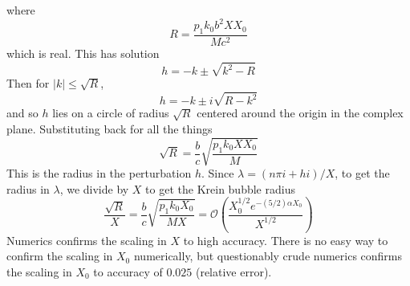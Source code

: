 \documentclass[thesis.tex]{subfiles}
\begin{document}
where 
\[
R = \frac{p_1 k_0 b^2 X X_0 }{M c^2}
\]
which is real. This has solution
\[
h = -k \pm \sqrt{k^2 - R}
\]
Then for $|k| \leq \sqrt{R}$,
\[
h = -k \pm i \sqrt{R - k^2}
\]
and so $h$ lies on a circle of radius $\sqrt{R}$ centered around the origin in the complex plane. Substituting back for all the things
\[
\sqrt{R} = \frac{b}{c} \sqrt{\frac{p_1 k_0 X X_0 }{M} }
\]
This is the radius in the perturbation $h$. Since $\lambda = (n \pi i + h i)/X$, to get the radius in $\lambda$, we divide by $X$ to get the Krein bubble radius
\[
\frac{\sqrt{R}}{X} = \frac{b}{c} \sqrt{\frac{p_1 k_0 X_0 }{M X} } = \mathcal{O}\left(\frac{ X_0^{1/2} e^{-(5/2) \alpha X_0} }{X^{1/2}} \right)
\] 
Numerics confirms the scaling in $X$ to high accuracy. There is no easy way to confirm the scaling in $X_0$ numerically, but questionably crude numerics confirms the scaling in $X_0$ to accuracy of $0.025$ (relative error).
\end{document}
